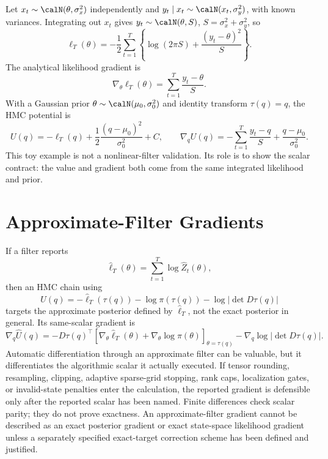 \begin{remark}
\label{ex:bf-hd-scalar-gaussian-gradient}
Let \(x_t\sim\calN(\theta,\sigma_x^2)\) independently and
\(y_t\mid x_t\sim\calN(x_t,\sigma_y^2)\), with known variances.  Integrating
out \(x_t\) gives \(y_t\sim\calN(\theta,S)\), \(S=\sigma_x^2+\sigma_y^2\), so
\[
  \ell_T(\theta)
  =
  -\frac12\sum_{t=1}^T
  \left\{\log(2\pi S)+\frac{(y_t-\theta)^2}{S}\right\}.
\]
The analytical likelihood gradient is
\[
  \nabla_\theta\ell_T(\theta)
  =
  \sum_{t=1}^T\frac{y_t-\theta}{S}.
\]
With a Gaussian prior \(\theta\sim\calN(\mu_0,\sigma_0^2)\) and identity
transform \(\tau(q)=q\), the HMC potential is
\[
  U(q)=-\ell_T(q)+\frac12\frac{(q-\mu_0)^2}{\sigma_0^2}+C,
  \qquad
  \nabla_q U(q)
  =
  -\sum_{t=1}^T\frac{y_t-q}{S}
  +\frac{q-\mu_0}{\sigma_0^2}.
  \label{eq:bf-hd-scalar-gaussian-hmc-gradient}
\]
This toy example is not a nonlinear-filter validation.  Its role is to show
the scalar contract: the value and gradient both come from the same integrated
likelihood and prior.
\end{remark}

\section{Approximate-Filter Gradients}
\label{sec:bf-hd-approx-filter-gradients}

If a filter reports
\[
  \widehat\ell_T(\theta)=\sum_{t=1}^T\log\widehat Z_t(\theta),
\]
then an HMC chain using
\[
  \widehat U(q)
  =
  -\widehat\ell_T(\tau(q))-\log\pi(\tau(q))
  -\log|\det D\tau(q)|
  \label{eq:bf-hd-approx-hmc-potential}
\]
targets the approximate posterior defined by \(\widehat\ell_T\), not the exact
posterior in general.  Its same-scalar gradient is
\[
  \nabla_q \widehat U(q)
  =
  -D\tau(q)^\top
  \left[
  \nabla_\theta\widehat\ell_T(\theta)+
  \nabla_\theta\log\pi(\theta)
  \right]_{\theta=\tau(q)}
  -
  \nabla_q\log|\det D\tau(q)|.
  \label{eq:bf-hd-approx-hmc-gradient}
\]
Automatic differentiation through an approximate filter can be valuable, but it
differentiates the algorithmic scalar it actually executed.  If tensor
rounding, resampling, clipping, adaptive sparse-grid stopping, rank caps,
localization gates, or invalid-state penalties enter the calculation, the
reported gradient is defensible only after the reported scalar has been named.
Finite differences check scalar parity; they do not prove exactness.  An
approximate-filter gradient cannot be described as an exact posterior gradient
or exact state-space likelihood gradient unless a separately specified
exact-target correction scheme has been defined and justified.

